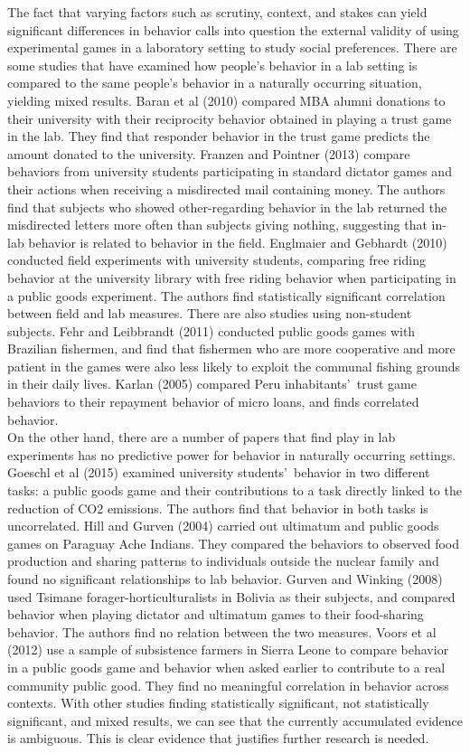\documentclass{article}
\begin{document}
The fact that varying factors such as scrutiny, context, and stakes can yield significant differences in behavior calls into question the external validity of using experimental games in a laboratory setting to study social preferences. There are some studies that have examined how people\rq s behavior in a lab setting is compared to the same people\rq s behavior in a naturally occurring situation, yielding mixed results. Baran et al (2010) compared MBA alumni donations to their university with their reciprocity behavior obtained in playing a trust game in the lab. They find that responder behavior in the trust game predicts the amount donated to the university. Franzen and Pointner (2013) compare behaviors from university students participating in standard dictator games and their actions when receiving a misdirected mail containing money. The authors find that subjects who showed other-regarding behavior in the lab returned the misdirected letters more often than subjects giving nothing, suggesting that in-lab behavior is related to behavior in the field. Englmaier and Gebhardt (2010) conducted field experiments with university students, comparing free riding behavior at the university library with free riding behavior when participating in a public goods experiment. The authors find statistically significant correlation between field and lab measures. There are also studies using non-student subjects. Fehr and Leibbrandt (2011) conducted public goods games with Brazilian fishermen, and find that fishermen who are more cooperative and more patient in the games were also less likely to exploit the communal fishing grounds in their daily lives. Karlan (2005) compared Peru inhabitants\rq  \ trust game behaviors to their repayment behavior of micro loans, and finds correlated behavior. \\

On the other hand, there are a number of papers that find play in lab experiments has no predictive power for behavior in naturally occurring settings. Goeschl et al (2015) examined university students\rq \ behavior in two different tasks: a public goods game and their contributions to a task directly linked to the reduction of CO2 emissions. The authors find that behavior in both tasks is uncorrelated. Hill and Gurven (2004) carried out ultimatum and public goods games on Paraguay Ache Indians. They compared the behaviors to observed food production and sharing patterns to individuals outside the nuclear family and found no significant relationships to lab behavior. Gurven and Winking (2008) used Tsimane forager-horticulturalists in Bolivia as their subjects, and compared behavior when playing dictator and ultimatum games to their food-sharing behavior. The authors find no relation between the two measures. Voors et al (2012) use a sample of subsistence farmers in Sierra Leone to compare behavior in a public goods game and behavior when asked earlier to contribute to a real community public good. They find no meaningful correlation in behavior across contexts. With other studies finding statistically significant, not statistically significant, and mixed results, we can see that the currently accumulated evidence is ambiguous. This is clear evidence that justifies further research is needed. \\
\end{document}
